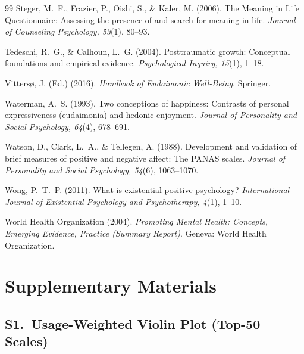 \documentclass[12pt,a4paper]{article}
\begin{document}
\begin{thebibliography}{99}
Steger, M.~F., Frazier, P., Oishi, S., \& Kaler, M. (2006).
The Meaning in Life Questionnaire: Assessing the presence of and search for meaning in life.
\textit{Journal of Counseling Psychology, 53}(1), 80--93.

Tedeschi, R.~G., \& Calhoun, L.~G. (2004).
Posttraumatic growth: Conceptual foundations and empirical evidence.
\textit{Psychological Inquiry, 15}(1), 1--18.

Vittersø, J. (Ed.) (2016).
\textit{Handbook of Eudaimonic Well-Being}.
Springer.

Waterman, A.~S. (1993).
Two conceptions of happiness: Contrasts of personal expressiveness (eudaimonia) and hedonic enjoyment.
\textit{Journal of Personality and Social Psychology, 64}(4), 678--691.

Watson, D., Clark, L.~A., \& Tellegen, A. (1988).
Development and validation of brief measures of positive and negative affect: The PANAS scales.
\textit{Journal of Personality and Social Psychology, 54}(6), 1063--1070.

Wong, P.~T.~P. (2011).
What is existential positive psychology?
\textit{International Journal of Existential Psychology and Psychotherapy, 4}(1), 1--10.

World Health Organization (2004).
\textit{Promoting Mental Health: Concepts, Emerging Evidence, Practice (Summary Report)}.
Geneva: World Health Organization.

\end{thebibliography}

\newpage
\appendix
\section*{Supplementary Materials}

\subsection*{S1.\ Usage-Weighted Violin Plot (Top-50 Scales)}
\end{document}
